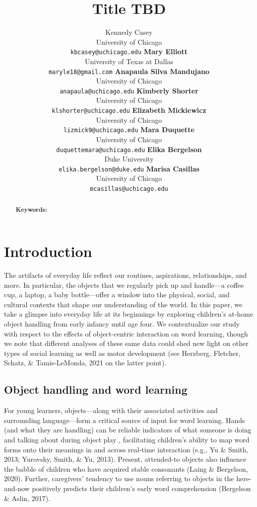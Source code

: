\documentclass[10pt, letterpaper]{article}
\title{Title TBD}
\author{Kennedy Casey \\
        University of Chicago \\
        \texttt{\small{kbcasey@uchicago.edu}}
\And \textbf{Mary Elliott} \\
             University of Texas at Dallas \\
             \texttt{\small{maryle18@gmail.com}}
\And \textbf{Anapaula Silva Mandujano} \\
             University of Chicago \\
             \texttt{\small{anapaula@uchicago.edu}}   
\And \textbf{Kimberly Shorter} \\
             University of Chicago \\
             \texttt{\small{klshorter@uchicago.edu}}
\AND \textbf{Elizabeth Mickiewicz} \\
             University of Chicago \\
             \texttt{\small{lizmick9@uchicago.edu}}         
\And \textbf{Mara Duquette} \\
             University of Chicago \\
             \texttt{\small{duquettemara@uchicago.edu}}
\And \textbf{Elika Bergelson} \\
             Duke University \\
             \texttt{\small{elika.bergelson@duke.edu}}
\And \textbf{Marisa Casillas} \\
             University of Chicago \\
             \texttt{\small{mcasillas@uchicago.edu}}}
\begin{document}
\maketitle

\begin{abstract}


\textbf{Keywords:}

\end{abstract}

\hypertarget{introduction}{%
\section{Introduction}\label{introduction}}

The artifacts of everyday life reflect our routines, aspirations,
relationships, and more. In particular, the objects that we regularly
pick up and handle---a coffee cup, a laptop, a baby bottle---offer a
window into the physical, social, and cultural contexts that shape our
understanding of the world. In this paper, we take a glimpse into
everyday life at its beginnings by exploring children's at-home object
handling from early infancy until age four. We contextualize our study
with respect to the effects of object-centric interaction on word
learning, though we note that different analyses of these same data
could shed new light on other types of social learning as well as motor
development (see Herzberg, Fletcher, Schatz, \& Tamis-LeMonda, 2021 on
the latter point).

\hypertarget{object-handling-and-word-learning}{%
\subsection{Object handling and word
learning}\label{object-handling-and-word-learning}}

For young learners, objects---along with their associated activities and
surrounding language---form a critical source of input for word
learning. Hands (and what they are handling) can be reliable indicators
of what someone is doing and talking about during object play ,
facilitating children's ability to map word forms onto their meanings in
and across real-time interaction (e.g., Yu \& Smith, 2013; Yurovsky,
Smith, \& Yu, 2013). Present, attended-to objects also influence the
babble of children who have acquired stable consonants (Laing \&
Bergelson, 2020). Further, caregivers' tendency to use nouns referring
to objects in the here-and-now positively predicts their children's
early word comprehension (Bergelson \& Aslin, 2017).
\end{document}
